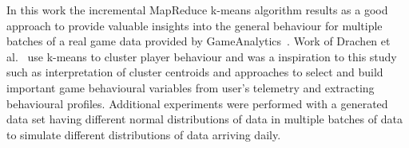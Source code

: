 In this work the incremental MapReduce k-means algorithm results as a good approach to provide valuable insights into the general behaviour for multiple batches of a real game data provided by GameAnalytics~\citep{GA2013}. Work of Drachen et al.~\citep{Drachen:2012, Drachen:2013} use k-means to cluster player behaviour and was a inspiration to this study such as interpretation of cluster centroids and approaches to select and build important game behavioural variables from user's telemetry and extracting behavioural profiles. Additional experiments were performed with a generated data set having different normal distributions of data in multiple batches of data to simulate different distributions of data arriving daily. 